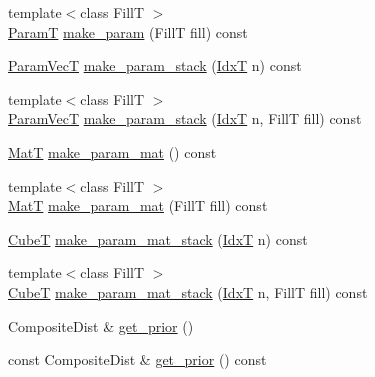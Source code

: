 \begin{DoxyCompactItemize}
{\footnotesize template$<$class FillT $>$ }\\\hyperlink{classmappel_1_1PointEmitterModel_a665ec6aea3aac139bb69a23c06d4b9a1}{ParamT} \hyperlink{classmappel_1_1PointEmitterModel_a5638e3df26cf84d7cf0f23112132682e}{make\+\_\+param} (FillT fill) const 
\item 
\hyperlink{classmappel_1_1PointEmitterModel_add253b568d763f1513a810aac35de719}{Param\+VecT} \hyperlink{classmappel_1_1PointEmitterModel_a6c7edc7f2549058df66472cd7647cf9b}{make\+\_\+param\+\_\+stack} (\hyperlink{namespacemappel_ab17ec0f30b61ece292439d7ece81d3a8}{IdxT} n) const 
\item 
{\footnotesize template$<$class FillT $>$ }\\\hyperlink{classmappel_1_1PointEmitterModel_add253b568d763f1513a810aac35de719}{Param\+VecT} \hyperlink{classmappel_1_1PointEmitterModel_abab975b04e09e6336a930b6d8fd8c267}{make\+\_\+param\+\_\+stack} (\hyperlink{namespacemappel_ab17ec0f30b61ece292439d7ece81d3a8}{IdxT} n, FillT fill) const 
\item 
\hyperlink{namespacemappel_a7091ab87c528041f7e2027195fad8915}{MatT} \hyperlink{classmappel_1_1PointEmitterModel_a8ede9fe8e3b6a3e621c2da72e23c7f9d}{make\+\_\+param\+\_\+mat} () const 
\item 
{\footnotesize template$<$class FillT $>$ }\\\hyperlink{namespacemappel_a7091ab87c528041f7e2027195fad8915}{MatT} \hyperlink{classmappel_1_1PointEmitterModel_a68a9c537f2f2725eb8fb9d3e250dd84b}{make\+\_\+param\+\_\+mat} (FillT fill) const 
\item 
\hyperlink{namespacemappel_ab2afab4e6c8805e83946670d882768c2}{CubeT} \hyperlink{classmappel_1_1PointEmitterModel_a57b98d5f8b2b5ed2c455bbf76b632f87}{make\+\_\+param\+\_\+mat\+\_\+stack} (\hyperlink{namespacemappel_ab17ec0f30b61ece292439d7ece81d3a8}{IdxT} n) const 
\item 
{\footnotesize template$<$class FillT $>$ }\\\hyperlink{namespacemappel_ab2afab4e6c8805e83946670d882768c2}{CubeT} \hyperlink{classmappel_1_1PointEmitterModel_a2c11fa045187c7ea9ba382141b5d53c1}{make\+\_\+param\+\_\+mat\+\_\+stack} (\hyperlink{namespacemappel_ab17ec0f30b61ece292439d7ece81d3a8}{IdxT} n, FillT fill) const 
\item 
Composite\+Dist \& \hyperlink{classmappel_1_1PointEmitterModel_a2182c250c15d590b582e76594e5f06b9}{get\+\_\+prior} ()
\item 
const Composite\+Dist \& \hyperlink{classmappel_1_1PointEmitterModel_a239826b8e6b914c0cdaa293f1f5ddfd4}{get\+\_\+prior} () const 

\end{DoxyCompactItemize}
